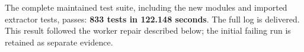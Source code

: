 The complete maintained test suite, including the new modules and imported
extractor tests, passes: \textbf{833 tests in 122.148 seconds}. The full log
is delivered. This result followed the worker repair described below; the
initial failing run is retained as separate evidence.
